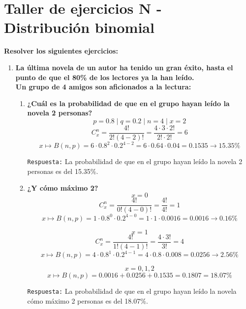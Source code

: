 \documentclass[12pt]{article}
\begin{document}
    

    \section*{\centering  Taller de ejercicios N - Distribución binomial} 
    \vspace{0.5cm}\textbf{Resolver los siguientes ejercicios:} \vspace{0.5cm}

    \begin{enumerate}[label=\textbf{\arabic*.}]
        \item \textbf{La última novela de un autor ha tenido un gran éxito, hasta el punto de que el 80\% de
        los lectores ya la han leído. \\
        Un grupo de 4 amigos son aficionados a la lectura:}

        \begin{enumerate}[label=\textbf{\alph*.}]
            \item \textbf{¿Cuál es la probabilidad de que en el grupo hayan leído la novela 2 personas?}
            \[p = 0.8 \mid q = 0.2 \mid n = 4 \mid x = 2\]
            \[C^{n}_{x} = \frac{4!}{2!(4-2)!} = \frac{4\cdot 3\cdot 2!}{2!\cdot 2!} = 6\]
            \[x \mapsto B(n, p) = 6 \cdot 0.8^{2} \cdot 0.2^{4-2} = 6 \cdot 0.64 \cdot 0.04 = 0.1535 \rightarrow 15.35\%\]

            \texttt{Respuesta:} La probabilidad de que en el grupo hayan leído la novela 2 personas es del 15.35\%.

            \item \textbf{¿Y cómo máximo 2?}
            \[x = 0\]
            \[C^{n}_{x} = \frac{4!}{0!(4-0)!} = \frac{4!}{4!} = 1\]
            \[x \mapsto B(n, p) = 1 \cdot 0.8^{0} \cdot 0.2^{4-0} = 1 \cdot 1 \cdot 0.0016 = 0.0016 \rightarrow 0.16\%\]

            \[x = 1\]
            \[C^{n}_{x} = \frac{4!}{1!(4-1)!} = \frac{4\cdot 3!}{3!} = 4\]
            \[x \mapsto B(n, p) = 4 \cdot 0.8^{1} \cdot 0.2^{4-1} = 4 \cdot 0.8 \cdot 0.008 = 0.0256 \rightarrow 2.56\%\]

            \[x = 0, 1, 2\]
            \[x \mapsto B(n, p) = 0.0016 + 0.0256 +0.1535 = 0.1807 = 18.07\%\]

            \texttt{Respuesta:} La probabilidad de que en el grupo hayan leído la novela cómo máximo 2 personas es del 18.07\%.
            

\end{enumerate}
\end{enumerate}
\end{document}
